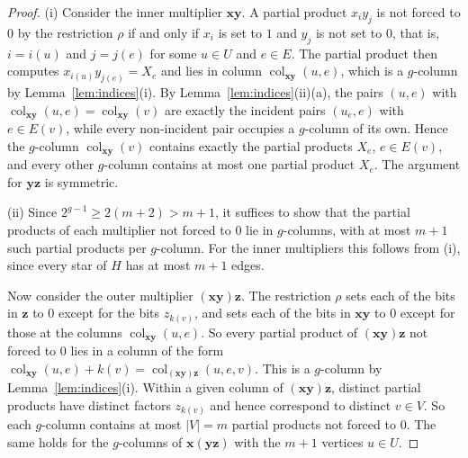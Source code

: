 \documentclass[11pt]{article}
\theoremstyle{definition}
\theoremstyle{remark}
\newcommand{\col}{\operatorname{col}}
\newcommand{\vv}[1]{\mathbf{#1}}
\begin{document}
\begin{proof}
(i) Consider the inner multiplier $\vv{x}\vv{y}$. A partial product $x_iy_j$ is not forced to $0$ by the restriction $\rho$ if and only if $x_i$ is
set to $1$ and $y_j$ is not set to $0$, that is, $i=i(u)$ and $j=j(e)$ for some $u\in U$ and $e\in E$. The partial product then computes
$x_{i(u)}y_{j(e)}=X_e$ and lies in column $\col_{\vv{xy}}(u,e)$, which is a $g$-column by Lemma~\ref{lem:indices}(i). By Lemma~\ref{lem:indices}(ii)(a), the pairs $(u,e)$ with $\col_{\vv{xy}}(u,e)=\col_{\vv{xy}}(v)$ are exactly the incident pairs
$(u_e,e)$ with $e\in E(v)$, while every non-incident pair occupies a $g$-column of its own. Hence the $g$-column $\col_{\vv{xy}}(v)$ contains exactly the partial products $X_e$, $e\in E(v)$, and every other $g$-column contains at
most one partial product $X_e$. The argument for $\vv{y}\vv{z}$ is symmetric.

(ii) Since $2^{g-1}\ge2(m+2)>m+1$, it suffices to show that the partial products of each multiplier
not forced to $0$ lie in $g$-columns, with at most $m+1$ such partial products per $g$-column. For the
inner multipliers this follows from (i), since every star of $H$ has at most $m+1$ edges.

Now consider the outer multiplier $(\vv{x}\vv{y})\vv{z}$. The restriction $\rho$ sets each of the bits in $\vv{z}$ to $0$ except for the bits $z_{k(v)}$, and sets each of the bits in $\vv{x}\vv{y}$ to $0$ except for those at the columns $\col_{\vv{xy}}(u,e)$. So every partial
product of $(\vv{x}\vv{y})\vv{z}$ not forced to $0$ lies in a column of the form $\col_{\vv{xy}}(u,e)+k(v)=\col_{(\vv{x}\vv{y})\vv{z}}(u,e,v)$. This is a $g$-column by
Lemma~\ref{lem:indices}(i). Within a given column of $(\vv{x}\vv{y})\vv{z}$, distinct partial products have distinct factors $z_{k(v)}$ and hence correspond to distinct $v\in V$. So each $g$-column contains at most $|V|=m$ partial products not forced to $0$. The same holds for the $g$-columns of
$\vv{x}(\vv{y}\vv{z})$ with the $m+1$ vertices $u \in U$.
\end{proof}
\end{document}
